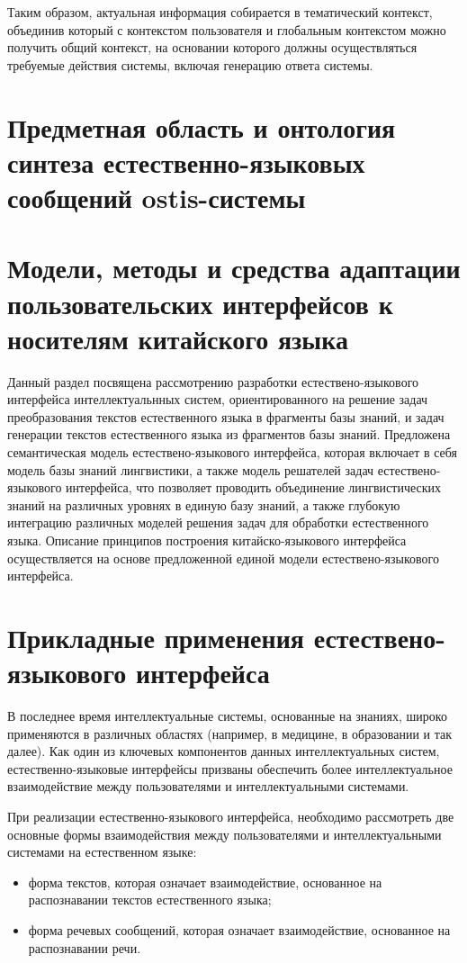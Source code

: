 Таким образом, актуальная информация собирается в тематический контекст, объединив который с контекстом пользователя и глобальным контекстом можно получить общий контекст, на основании которого должны осуществляться требуемые действия системы, включая генерацию ответа системы.

\section{Предметная область и онтология синтеза естественно-языковых сообщений ostis-системы}
\section{Модели, методы и средства адаптации пользовательских интерфейсов к носителям китайского языка}
\label{section_chinese_interfaces}
Данный раздел посвящена рассмотрению разработки естествено-языкового интерфейса интеллектуальнных систем, ориентированного на решение задач преобразования текстов естественного языка в фрагменты базы знаний, и задач генерации текстов естественного языка из фрагментов базы знаний. Предложена семантическая модель естествено-языкового интерфейса, которая включает в себя модель базы знаний лингвистики, а также модель решателей задач естествено-языкового интерфейса, что позволяет проводить объединение лингвистических знаний на различных уровнях в единую базу знаний, а также глубокую интеграцию различных моделей решения задач для обработки естественного языка. Описание принципов построения китайско-языкового интерфейса осуществляется на основе предложенной единой модели естествено-языкового интерфейса.

\section{Прикладные применения естествено-языкового интерфейса}
В последнее время интеллектуальные системы, основанные на знаниях, широко применяются в различных областях (например, в медицине, в образовании и так далее). Как один из ключевых компонентов данных интеллектуальных систем, естественно-языковые интерфейсы призваны обеспечить более интеллектуальное взаимодействие между пользователями и интеллектуальными системами.

При реализации естественно-языкового интерфейса, необходимо рассмотреть две основные формы взаимодействия между пользователями и интеллектуальными системами на естественном языке:
\begin{itemize}
	\item форма текстов, которая означает взаимодействие, основанное на распознавании текстов естественного языка;
	\item форма речевых сообщений, которая означает взаимодействие, основанное на распознавании речи.
\end{itemize}

